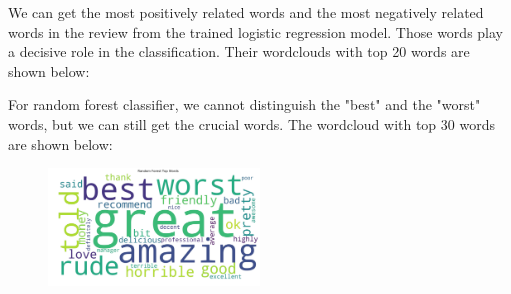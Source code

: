 \documentclass[12pt]{article}
\begin{document}
We can get the most positively related words and the most negatively related words in the review from the trained logistic regression model. Those words play a decisive role in the classification. Their wordclouds with top 20 words are shown below:
\begin{figure}[H]
\captionsetup[subfigure]{labelformat=empty}
\centering
{}
\end{figure}

For random forest classifier, we cannot distinguish the "best" and the "worst" words, but we can still get the crucial words. The wordcloud with top 30 words are shown below:
\begin{figure}[H]
\begin{center}
    \includegraphics[width=0.5\textwidth]{"../05_dataMining/Random Forest Top Words"}
\end{center}
\end{figure}
\end{document}
